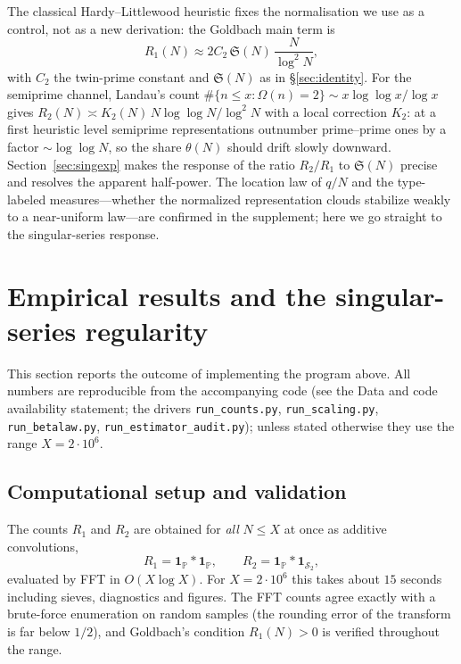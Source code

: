 \documentclass[]{interact}%
\newcommand{\PP}{\mathbb P}
\newcommand{\SSemi}{\mathcal S_2}
\newcommand{\OmegaF}{\Omega}
\newcommand{\sing}{\mathfrak S}
\begin{document}
The classical Hardy--Littlewood heuristic \citep{hardylittlewood1923} fixes the normalisation we
use as a control, not as a new derivation: the Goldbach main term is
\begin{equation}
  R_1(N) \approx 2C_2\,\sing(N)\,\frac{N}{\log^2 N},
  \label{eq:HL}
\end{equation}
with $C_2$ the twin-prime constant and $\sing(N)$ as in \S\ref{sec:identity}. For the semiprime
channel, Landau's count $\#\{n\le x:\OmegaF(n)=2\}\sim x\log\log x/\log x$ \citep{landau1909}
gives $R_2(N)\asymp K_2(N)\,N\log\log N/\log^2 N$ with a local correction $K_2$: at a first
heuristic level semiprime representations outnumber prime--prime ones by a factor
$\sim\log\log N$, so the share $\theta(N)$ should drift slowly downward. Section~\ref{sec:singexp}
makes the response of the ratio $R_2/R_1$ to $\sing(N)$ precise and resolves the apparent
half-power. The location law of $q/N$ and the type-labeled measures---whether the normalized
representation clouds stabilize weakly to a near-uniform law---are confirmed in the supplement;
here we go straight to the singular-series response.

\section{Empirical results and the singular-series regularity}
\label{sec:empirical}

This section reports the outcome of implementing the program above. All numbers are
reproducible from the accompanying code (see the Data and code availability statement;
the drivers \texttt{run\_counts.py}, \texttt{run\_scaling.py}, \texttt{run\_betalaw.py},
\texttt{run\_estimator\_audit.py}); unless stated otherwise they use the range
$X=2\cdot10^{6}$.

\subsection{Computational setup and validation}

The counts $R_1$ and $R_2$ are obtained for \emph{all} $N\le X$ at once as additive
convolutions,
\[
  R_1=\mathbf 1_{\PP}*\mathbf 1_{\PP},\qquad
  R_2=\mathbf 1_{\PP}*\mathbf 1_{\SSemi},
\]
evaluated by FFT in $O(X\log X)$. For $X=2\cdot10^{6}$ this takes about $15$
seconds including sieves, diagnostics and figures. The FFT counts agree exactly
with a brute-force enumeration on random samples (the rounding error of the
transform is far below $1/2$), and Goldbach's condition $R_1(N)>0$ is verified
throughout the range.
\end{document}
